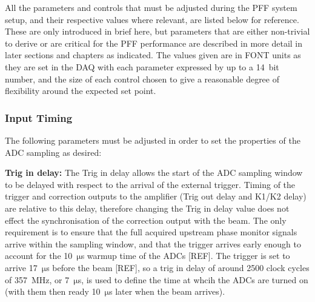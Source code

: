 
All the parameters and controls that must be adjusted during the PFF system setup, and their respective values where relevant, are listed below for reference. These are only introduced in brief here, but parameters that are either non-trivial to derive or are critical for the PFF performance are described in more detail in later sections and chapters as indicated. The values given are in FONT units as they are set in the DAQ with each parameter expressed by up to a 14~bit number, and the size of each control chosen to give a reasonable degree of flexibility around the expected set point. 

\subsubsection{Input Timing}

The following parameters must be adjusted in order to set the properties of the ADC sampling as desired:

\textbf{Trig in delay:} The Trig in delay allows the start of the ADC sampling window to be delayed with respect to the arrival of the external trigger. Timing of the trigger and correction outputs to the amplifier (Trig out delay and K1/K2 delay) are relative to this delay, therefore changing the Trig in delay value does not effect the synchronisation of the correction output with the beam. The only requirement is to ensure that the full acquired upstream phase monitor signals arrive within the sampling window, and that the trigger arrives early enough to account for the 10~\(\mathrm{\mu}\)s warmup time of the ADCs [REF]. The trigger is set to arrive 17~\(\mathrm{\mu}\)s before the beam [REF], so a trig in delay of around 2500 clock cycles of 357~MHz, or 7~\(\mathrm{\mu}\)s, is used to define the time at whcih the ADCs are turned on (with them then ready 10~\(\mathrm{\mu}\)s later when the beam arrives).

